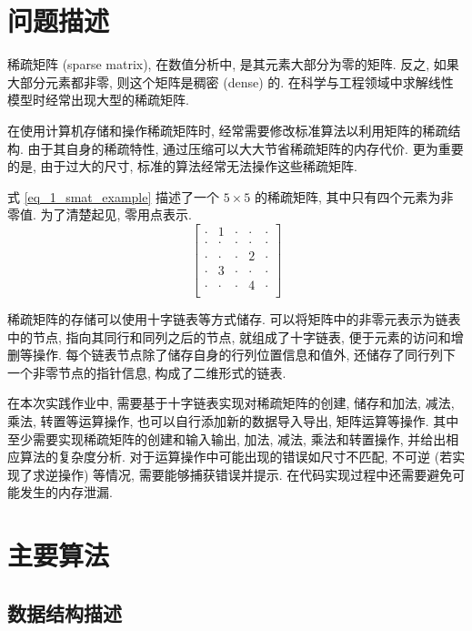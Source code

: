\section{问题描述}

稀疏矩阵 (sparse matrix), 在数值分析中, 是其元素大部分为零的矩阵. 反之, 如果大部分元素都非零, 则这个矩阵是稠密 (dense) 的. 在科学与工程领域中求解线性模型时经常出现大型的稀疏矩阵.

在使用计算机存储和操作稀疏矩阵时, 经常需要修改标准算法以利用矩阵的稀疏结构. 由于其自身的稀疏特性, 通过压缩可以大大节省稀疏矩阵的内存代价. 更为重要的是, 由于过大的尺寸, 标准的算法经常无法操作这些稀疏矩阵.

式 \ref{eq_1_smat_example} 描述了一个 $5 \times 5$ 的稀疏矩阵, 其中只有四个元素为非零值. 为了清楚起见, 零用点表示.
\begin{equation}
    \begin{bmatrix}
        \cdot & 1 & \cdot & \cdot & \cdot \\
        \cdot & \cdot & \cdot & \cdot & \cdot \\
        \cdot & \cdot & \cdot & 2 & \cdot \\
        \cdot & 3 & \cdot & \cdot & \cdot \\
        \cdot & \cdot & \cdot & 4 & \cdot \\
    \end{bmatrix}
    \label{eq_1_smat_example}
\end{equation}

稀疏矩阵的存储可以使用十字链表等方式储存. 可以将矩阵中的非零元表示为链表中的节点, 指向其同行和同列之后的节点, 就组成了十字链表, 便于元素的访问和增删等操作. 每个链表节点除了储存自身的行列位置信息和值外, 还储存了同行列下一个非零节点的指针信息, 构成了二维形式的链表.

在本次实践作业中, 需要基于十字链表实现对稀疏矩阵的创建, 储存和加法, 减法, 乘法, 转置等运算操作, 也可以自行添加新的数据导入导出, 矩阵运算等操作. 其中至少需要实现稀疏矩阵的创建和输入输出, 加法, 减法, 乘法和转置操作, 并给出相应算法的复杂度分析. 对于运算操作中可能出现的错误如尺寸不匹配, 不可逆 (若实现了求逆操作) 等情况, 需要能够捕获错误并提示. 在代码实现过程中还需要避免可能发生的内存泄漏.

\section{主要算法}

\subsection{数据结构描述}

